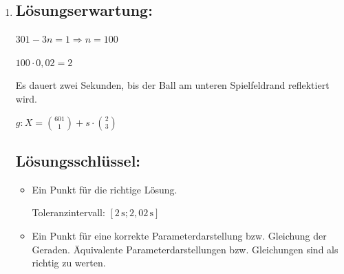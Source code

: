 \begin{langesbeispiel}
{\begin{enumerate}
$\tan(\alpha)=\frac{7}{4}=1,74$

$\alpha\approx 60,26^\circ$

Unter diesen Bedingungen lautet der Geschwindigkeitsvektor $\vec{v}= \binom{\pm\,19}{\pm\,1}$ Pixel pro Bildaufbau. Für den Winkel $\beta_\text{min}$ gibt das in jedem Fall:

 $\tan(\beta_\text{min})=\frac{1}{19}$

 $\beta_\text{min}\approx 3,01^\circ$

	\subsection{Lösungsschlüssel:}
	\begin{itemize}
		\item Ein Ausgleichspunkt für die richtige Lösung, wobei die Einheit "`Grad"' nicht angegeben sein muss. Eine korrekte Angabe der Lösung in einer anderen Einheit ist ebenfalls als richtig zu werten. 
		
		Toleranzintervall: $[6011^\circ; 60,3^\circ]$
		\item Ein Punkt für die richtige Lösung, wobei die Einheit "`Grad"' nicht angegeben sein muss. Eine korrekte Angabe der Lösung in einer anderen Einheit ist ebenfalls als richtig zu werten. 
		
		Toleranzintervall: $[3^\circ; 3,02^\circ]$
	\end{itemize}
	
	\item \subsection{Lösungserwartung:}
			
	$301-3n=1 \Rightarrow n=100$
	
	$100\cdot 0,02=2$
	
	Es dauert zwei Sekunden, bis der Ball am unteren Spielfeldrand reflektiert wird.\leer
	
	$g: X=\binom{601}{1}+s\cdot\binom{2}{3}$

	\subsection{Lösungsschlüssel:}
	
\begin{itemize}
	\item Ein Punkt für die richtige Lösung. 
	
	Toleranzintervall: $[2\,\text{s}; 2,02\,\text{s}]$
	\item Ein Punkt für eine korrekte Parameterdarstellung bzw. Gleichung der Geraden. Äquivalente Parameterdarstellungen bzw. Gleichungen sind als richtig zu werten. 
\end{itemize}


\end{enumerate}}
\end{langesbeispiel}
